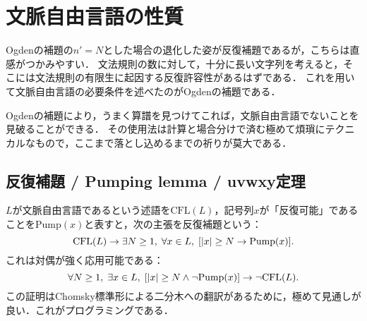 \documentclass[uplatex, dvipdfmx]{jsreport}
\begin{document}
\section{文脈自由言語の性質}

\begin{tcolorbox}[colframe=ForestGreen, colback=ForestGreen!10!white, breakable]
    Ogdenの補題の$n'=N$とした場合の退化した姿が反復補題であるが，こちらは直感がつかみやすい．
    文法規則の数に対して，十分に長い文字列を考えると，そこには文法規則の有限生に起因する反復許容性があるはずである．
    これを用いて文脈自由言語の必要条件を述べたのがOgdenの補題である．

    Ogdenの補題により，うまく算譜を見つけてこれば，文脈自由言語でないことを見破ることができる．
    その使用法は計算と場合分けで済む極めて煩瑣にテクニカルなもので，ここまで落とし込めるまでの祈りが莫大である．
\end{tcolorbox}

\subsection{反復補題 / Pumping lemma / uvwxy定理}

\begin{tcolorbox}[colframe=ForestGreen, colback=ForestGreen!10!white, breakable]
    $L$が文脈自由言語であるという述語を$\mathrm{CFL}(L)$，記号列$x$が「反復可能」であることを$\mathrm{Pump}(x)$と表すと，次の主張を反復補題という：
    \[\mathrm{CFL}(L)\to\exists N\ge 1,\;\forall x\in L,\;[\lvert x\rvert\ge N\to\mathrm{Pump}(x)].\]
    これは対偶が強く応用可能である：
    \[\forall N\ge 1,\;\exists x\in L,\;[\lvert x\rvert\ge N\land \lnot\mathrm{Pump}(x)]\to \lnot\mathrm{CFL}(L).\]
    この証明はChomsky標準形による二分木への翻訳があるために，極めて見通しが良い．これがプログラミングである．
\end{tcolorbox}
\end{document}
